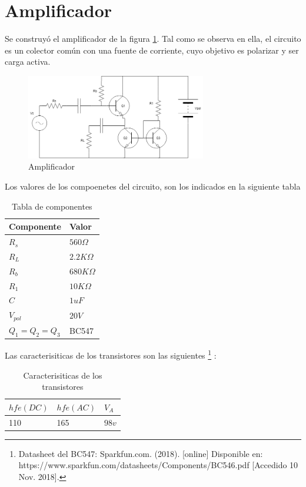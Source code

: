 \documentclass[../../main.tex]{subfiles}
\begin{document}
\section{Amplificador}
Se construyó el amplificador de la figura \ref{fig:cir}. Tal como se observa en ella, el circuito es un colector común con una fuente de corriente, cuyo objetivo es polarizar y ser carga activa.

\begin{figure}[H]	
	\centering
	\includegraphics[width=0.7\textwidth]{imagenes/circuito.png}
	\caption{Amplificador}\label{fig:cir}
\end{figure}

Los valores de los compoenetes del circuito, son los indicados en la siguiente tabla
\begin{table}[h]
\begin{center}
\begin{tabular}{|l|l|}
\hline
Componente& Valor\\
\hline \hline
$R_s$ & $560 \Omega$  \\ \hline
$R_L$ & $2.2 K \Omega$  \\ \hline
$R_b$ & $680 K \Omega$  \\ \hline
$R_1$ & $10K\Omega$  \\ \hline
$C$ & $1uF$  \\ \hline
$V_{pol}$ & $20V$  \\ \hline
$Q_1 = Q_2 = Q_3$ & BC547  \\ \hline

\end{tabular}
\caption{Tabla de componentes} \label{tab:comp}
\end{center}
\end{table}


Las caracterisiticas de los transistores son las siguientes \footnote{Datasheet del BC547: Sparkfun.com. (2018). [online] Disponible en: https://www.sparkfun.com/datasheets/Components/BC546.pdf [Accedido 10 Nov. 2018].} :

\begin{table}[h]
\begin{center}
\begin{tabular}{|l|l|l|}
\hline
$hfe(DC)$& $hfe(AC)$&$V_A$\\
\hline \hline
110&165 &$98v$\\ \hline

\end{tabular}
\caption{Caracterisiticas de los transistores} \label{tab:qcar}
\end{center}
\end{table}
\end{document}
